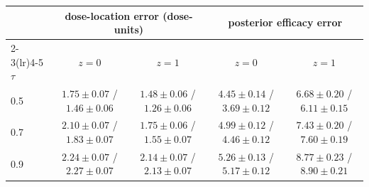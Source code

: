 \begin{tabular}{@{}lcccc@{}}
\toprule
 & \multicolumn{2}{c}{dose-location error (dose-units)} & \multicolumn{2}{c}{posterior efficacy error} \\
\cmidrule(lr){2-3}\cmidrule(lr){4-5}
$\tau$ & $z{=}0$ & $z{=}1$ & $z{=}0$ & $z{=}1$ \\
\midrule
0.5 & $1.75{\pm}0.07$ / $1.46{\pm}0.06$ & $1.48{\pm}0.06$ / $1.26{\pm}0.06$ & $4.45{\pm}0.14$ / $3.69{\pm}0.12$ & $6.68{\pm}0.20$ / $6.11{\pm}0.15$ \\
0.7 & $2.10{\pm}0.07$ / $1.83{\pm}0.07$ & $1.75{\pm}0.06$ / $1.55{\pm}0.07$ & $4.99{\pm}0.12$ / $4.46{\pm}0.12$ & $7.43{\pm}0.20$ / $7.60{\pm}0.19$ \\
0.9 & $2.24{\pm}0.07$ / $2.27{\pm}0.07$ & $2.14{\pm}0.07$ / $2.13{\pm}0.07$ & $5.26{\pm}0.13$ / $5.17{\pm}0.12$ & $8.77{\pm}0.23$ / $8.90{\pm}0.21$ \\
\bottomrule
\end{tabular}
